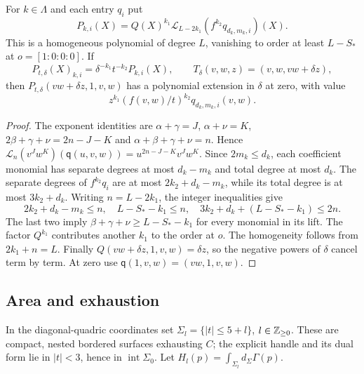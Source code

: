 \begin{lemma}\label{lem:sxm-lift}
For $k\in\Lambda$ and each entry $q_i$ put
\[
 P_{k,i}(X)=Q(X)^{k_1}\mathcal L_{L-2k_1}(f^{k_2}q_{d_k,m_k,i})(X).
\]
This is a homogeneous polynomial of degree $L$, vanishing to order at least $L-S_*$
at $o=[1:0:0:0]$. If
\[
 P_{t,\delta}(X)_{k,i}=\delta^{-k_1}t^{-k_2}P_{k,i}(X),\qquad
 T_\delta(v,w,z)=(v,w,vw+\delta z),
\]
then $P_{t,\delta}(vw+\delta z,1,v,w)$ has a polynomial extension in $\delta$ at zero,
with value
\[
 z^{k_1}(f(v,w)/t)^{k_2}q_{d_k,m_k,i}(v,w).
\]
\end{lemma}

\begin{proof}
The exponent identities are
$\alpha+\gamma=J$, $\alpha+\nu=K$,
$2\beta+\gamma+\nu=2n-J-K$ and
$\alpha+\beta+\gamma+\nu=n$.
Hence $\mathcal L_n(v^Jw^K)(\mathsf q(u,v,w))=u^{2n-J-K}v^Jw^K$.
Since $2m_k\le d_k$, each coefficient monomial has separate degrees at most
$d_k-m_k$ and total degree at most $d_k$.
The separate degrees of $f^{k_2}q_i$ are at most $2k_2+d_k-m_k$, while its total
degree is at most $3k_2+d_k$.
Writing $n=L-2k_1$, the integer inequalities give
\[
 2k_2+d_k-m_k\le n,\quad L-S_*-k_1\le n,\quad
 3k_2+d_k+(L-S_*-k_1)\le2n.
\]
The last two imply $\beta+\gamma+\nu\ge L-S_*-k_1$ for every monomial in its lift.
The factor $Q^{k_1}$ contributes another $k_1$ to the order at $o$.
The homogeneity follows from $2k_1+n=L$.
Finally $Q(vw+\delta z,1,v,w)=\delta z$, so the negative powers of $\delta$ cancel
term by term. At zero use $\mathsf q(1,v,w)=(vw,1,v,w)$.
\end{proof}

\subsection{Area and exhaustion}\label{sec:sxm-bordered}

In the diagonal-quadric coordinates set
$\Sigma_l=\{|t|\le5+l\}$, $l\in\mathbb{Z}_{\ge0}$.
These are compact, nested bordered surfaces exhausting $C$; the explicit handle and
its dual form lie in $|t|<3$, hence in $\operatorname{int}\Sigma_0$.
Let $H_l(p)=\int_{\Sigma_l}d_\Sigma\Gamma(p)$.

